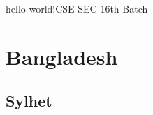 \documentclass{article}
\begin{document}
hello world!CSE SEC 16th Batch
\section{Bangladesh}
\subsection{Sylhet}
\end{document}
